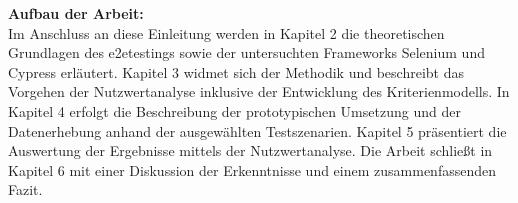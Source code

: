 \textbf{Aufbau der Arbeit:}\\
Im Anschluss an diese Einleitung werden in Kapitel 2 die theoretischen Grundlagen des \gls{e2etest}ings sowie der untersuchten Frameworks Selenium und Cypress erläutert. 
Kapitel 3 widmet sich der Methodik und beschreibt das Vorgehen der Nutzwertanalyse inklusive der Entwicklung des Kriterienmodells. 
In Kapitel 4 erfolgt die Beschreibung der prototypischen Umsetzung und der Datenerhebung anhand der ausgewählten Testszenarien. 
Kapitel 5 präsentiert die Auswertung der Ergebnisse mittels der Nutzwertanalyse. Die Arbeit schließt in Kapitel 6 mit einer Diskussion der Erkenntnisse und einem zusammenfassenden Fazit.

\clearpage